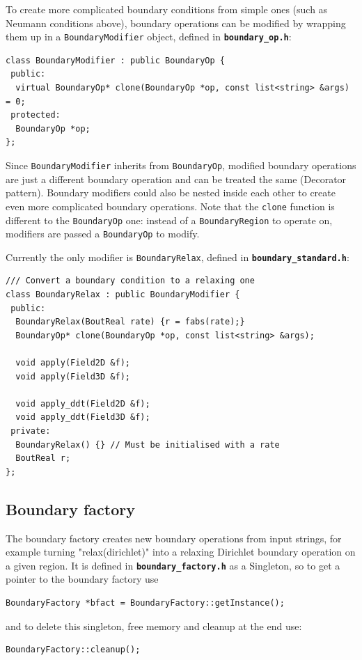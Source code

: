 \documentclass[12pt]{article}
\newcommand{\code}[1]{\texttt{#1}}
\newcommand{\file}[1]{\texttt{\bf #1}}
\begin{document}
To create more complicated boundary conditions from simple ones (such as
Neumann conditions above), boundary operations can be modified by
wrapping them up in a \code{BoundaryModifier} object, defined
in \file{boundary\_op.h}: 
\begin{lstlisting}[firstnumber=63]
class BoundaryModifier : public BoundaryOp {
 public:
  virtual BoundaryOp* clone(BoundaryOp *op, const list<string> &args) = 0;
 protected:
  BoundaryOp *op;
};
\end{lstlisting}
Since \code{BoundaryModifier} inherits from \code{BoundaryOp}, 
modified boundary operations are just a different boundary operation and can
be treated the same (Decorator pattern). Boundary modifiers could also be
nested inside each other to create even more complicated boundary operations.
Note that the \code{clone} function is different to the \code{BoundaryOp} one:
instead of a \code{BoundaryRegion} to operate on, modifiers are passed a
\code{BoundaryOp} to modify.

Currently the only modifier is \code{BoundaryRelax}, defined in
\file{boundary\_standard.h}: 
\begin{lstlisting}[firstnumber=64]
/// Convert a boundary condition to a relaxing one
class BoundaryRelax : public BoundaryModifier {
 public:
  BoundaryRelax(BoutReal rate) {r = fabs(rate);}
  BoundaryOp* clone(BoundaryOp *op, const list<string> &args);
  
  void apply(Field2D &f);
  void apply(Field3D &f);
  
  void apply_ddt(Field2D &f);
  void apply_ddt(Field3D &f);
 private:
  BoundaryRelax() {} // Must be initialised with a rate
  BoutReal r;
};
\end{lstlisting}

\subsection{Boundary factory}
\label{sec:BoundaryFactory}
The boundary factory creates new boundary operations from input strings,
for example turning "relax(dirichlet)" into a relaxing Dirichlet boundary
operation on a given region. It is defined in \file{boundary\_factory.h}
as a Singleton, so to get a pointer to the boundary factory use
\begin{lstlisting}[numbers=none]
  BoundaryFactory *bfact = BoundaryFactory::getInstance();
\end{lstlisting}
and to delete this singleton, free memory and cleanup at the end use:
\begin{lstlisting}[numbers=none]
  BoundaryFactory::cleanup();
\end{lstlisting}
\end{document}
